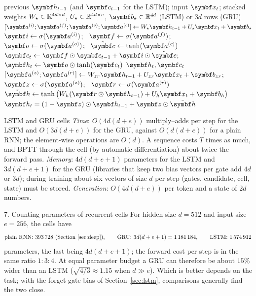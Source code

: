\documentclass[11pt]{article}
\newcommand{\hv}{\vect{h}}
\newcommand{\av}{\vect{a}}
\newcommand{\bv}{\vect{b}}
\newcommand{\cv}{\vect{c}}
\newcommand{\zv}{\vect{z}}
\newcommand{\iv}{\vect{i}}
\newcommand{\fv}{\vect{f}}
\newcommand{\ov}{\vect{o}}
\newcommand{\rv}{\vect{r}}
\newcommand{\ctil}{\tilde{\vect{c}}}
\newcommand{\htil}{\tilde{\vect{h}}}
\begin{document}
\begin{algorithm}[htbp]
\caption{One step of an LSTM and of a GRU (the affine maps of all gates are one matrix product)}\label{alg:lstm}
\begin{algorithmic}[1]
\Require previous $\hv_{t-1}$ (and $\cv_{t-1}$ for the LSTM); input $\x_t$; stacked weights
  $W_\star \in \mathbb{R}^{4d \times d}$, $U_\star \in \mathbb{R}^{4d \times e}$, $\bv_\star \in \R^{4d}$ (LSTM) or $3d$ rows (GRU)
\Function{LSTMStep}{$\hv_{t-1}, \cv_{t-1}, \x_t$}
  \State $[\av^{(i)}; \av^{(f)}; \av^{(o)}; \av^{(c)}] \gets W_\star\hv_{t-1} + U_\star\x_t + \bv_\star$
  \State $\iv \gets \sigma(\av^{(i)})$; \ $\fv \gets \sigma(\av^{(f)})$; \ $\ov \gets \sigma(\av^{(o)})$; \ $\ctil \gets \tanh(\av^{(c)})$
  \State $\cv_t \gets \fv \odot \cv_{t-1} + \iv \odot \ctil$; \ $\hv_t \gets \ov \odot \tanh(\cv_t)$ 
  \State \Return $\hv_t, \cv_t$
\EndFunction
\Function{GRUStep}{$\hv_{t-1}, \x_t$}
  \State $[\av^{(z)}; \av^{(r)}] \gets W_{zr}\hv_{t-1} + U_{zr}\x_t + \bv_{zr}$; \ $\zv \gets \sigma(\av^{(z)})$; \ $\rv \gets \sigma(\av^{(r)})$
  \State $\htil \gets \tanh\big(W_h(\rv \odot \hv_{t-1}) + U_h\x_t + \bv_h\big)$ 
  \State \Return $\hv_t = (1 - \zv) \odot \hv_{t-1} + \zv \odot \htil$
\EndFunction
\end{algorithmic}
\end{algorithm}

\begin{runtime}{LSTM and GRU cells}
\emph{Time}: $O(4d(d + e))$ multiply--adds per step for the LSTM and $O(3d(d + e))$ for the GRU, against $O(d(d + e))$ for a
plain RNN; the element-wise operations are $O(d)$. A sequence costs $T$ times as much, and BPTT through the cell (by
automatic differentiation) about twice the forward pass. \emph{Memory}: $4d(d + e + 1)$ parameters for the LSTM and
$3d(d + e + 1)$ for the GRU (libraries that keep two bias vectors per gate add $4d$ or $3d$); during training about six
vectors of size $d$ per step (gates, candidate, cell, state) must be stored. \emph{Generation}: $O(4d(d + e))$ per token and a
state of $2d$ numbers.
\end{runtime}

\begin{worked}{7. Counting parameters of recurrent cells}
For hidden size $d = 512$ and input size $e = 256$, the cells have
\[
  \text{plain RNN: } 393\,728 \ (\text{Section~\ref{sec:deep}}), \qquad \text{GRU: } 3d(d + e + 1) = 1\,181\,184, \qquad
  \text{LSTM: } 1\,574\,912
\]
parameters, the last being $4d(d + e + 1)$; the forward cost per step is in the same ratio $1 : 3 : 4$. At equal parameter budget a GRU can therefore be
about $15\%$ wider than an LSTM ($\sqrt{4/3} \approx 1.15$ when $d \gg e$). Which is better depends on the task; with
the forget-gate bias of Section~\ref{sec:lstm}, comparisons generally find the two close.
\end{worked}
\end{document}
